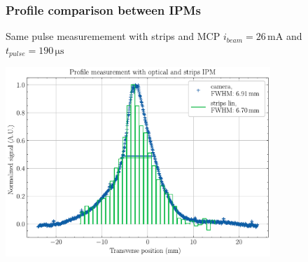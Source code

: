 \begin{frame}[t]
  \frametitle{Profile comparison between IPMs}
  \begin{block}{Same pulse measuremement with strips and MCP}
    $i_{beam}=26\,\mathrm{mA}$ and $t_{pulse}=190\,\mathrm{\mu s}$
  \end{block}
  \begin{center}
    \includegraphics[width=0.75\textwidth]{04_Test/fig/fig000_MCP_strip}
  \end{center}
\end{frame}

